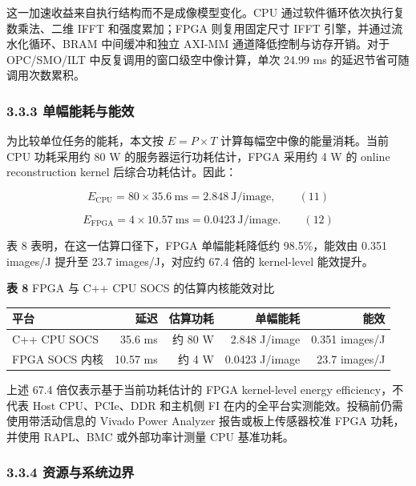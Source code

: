 \documentclass[
  preprint]{elsarticle}
\newcounter{none} %
\begin{document}
这一加速收益来自执行结构而不是成像模型变化。CPU
通过软件循环依次执行复数乘法、二维 IFFT 和强度累加；FPGA 则复用固定尺寸
IFFT 引擎，并通过流水化循环、BRAM 中间缓冲和独立 AXI-MM
通道降低控制与访存开销。对于 OPC/SMO/ILT
中反复调用的窗口级空中像计算，单次 24.99 ms 的延迟节省可随调用次数累积。

\subsubsection{3.3.3
单幅能耗与能效}\label{ux5355ux5e45ux80fdux8017ux4e0eux80fdux6548}

为比较单位任务的能耗，本文按 \(E=P\times T\)
计算每幅空中像的能量消耗。当前 CPU 功耗采用约 80 W
的服务器运行功耗估计，FPGA 采用约 4 W 的 online reconstruction kernel
后综合功耗估计。因此：

\[
E_{\mathrm{CPU}}=80\times35.6\ \mathrm{ms}=2.848\ \mathrm{J/image},
\qquad\mathrm{(11)}
\]

\[
E_{\mathrm{FPGA}}=4\times10.57\ \mathrm{ms}=0.0423\ \mathrm{J/image}.
\qquad\mathrm{(12)}
\]

表 8 表明，在这一估算口径下，FPGA 单幅能耗降低约 98.5\%，能效由 0.351
images/J 提升至 23.7 images/J，对应约 67.4 倍的 kernel-level 能效提升。

\textbf{表 8} FPGA 与 C++ CPU SOCS 的估算内核能效对比

{\def\LTcaptype{none} %
\begin{longtable}[]{@{}lrrrr@{}}
\toprule\noalign{}
平台 & 延迟 & 估算功耗 & 单幅能耗 & 能效 \\
\midrule\noalign{}
\endhead
\bottomrule\noalign{}
\endlastfoot
C++ CPU SOCS & 35.6 ms & 约 80 W & 2.848 J/image & 0.351 images/J \\
FPGA SOCS 内核 & 10.57 ms & 约 4 W & 0.0423 J/image & 23.7 images/J \\
\end{longtable}
}

上述 67.4 倍仅表示基于当前功耗估计的 FPGA kernel-level energy
efficiency，不代表 Host CPU、PCIe、DDR 和主机侧 FI
在内的全平台实测能效。投稿前仍需使用带活动信息的 Vivado Power Analyzer
报告或板上传感器校准 FPGA 功耗，并使用 RAPL、BMC 或外部功率计测量 CPU
基准功耗。

\subsubsection{3.3.4
资源与系统边界}\label{ux8d44ux6e90ux4e0eux7cfbux7edfux8fb9ux754c}
\end{document}
